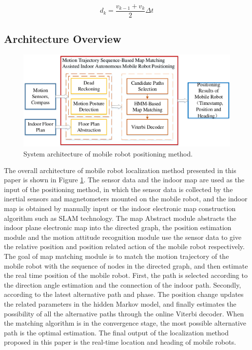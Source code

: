 \documentclass{llncs}
\begin{document}
\begin{equation}
\label{equ_distance}
{d_k} = \frac{{{v_{k - 1}} + {v_k}}}{2}\Delta t
\end{equation}


\subsection{Architecture Overview}

\begin{figure}[!htbp]
	\centering
	\includegraphics[width=4.8in]{RobotMatch-Architecture}
	\caption{System architecture of mobile robot positioning method.}
	\label{fig-architect}
\end{figure}

The overall architecture of mobile robot localization method presented in this paper is shown in Figure \ref{fig-architect}. The sensor data and the indoor map are used as the input of the positioning method, in which the sensor data is collected by the inertial sensors and magnetometers mounted on the mobile robot, and the indoor map is obtained by manually input or the indoor electronic map construction algorithm such as SLAM technology. The map Abstract module abstracts the indoor plane electronic map into the directed graph, the position estimation module and the motion attitude recognition module use the sensor data to give the relative position and position related action of the mobile robot respectively. The goal of map matching module is to match the motion trajectory of the mobile robot with the sequence of nodes in the directed graph, and then estimate the real time position of the mobile robot. First, the path is selected according to the direction angle estimation and the connection of the indoor path. Secondly, according to the latest alternative path and phase. The position change updates the related parameters in the hidden Markov model, and finally estimates the possibility of all the alternative paths through the online Viterbi decoder. When the matching algorithm is in the convergence stage, the most possible alternative path is the optimal estimation. The final output of the localization method proposed in this paper is the real-time location and heading of mobile robots.
\end{document}
